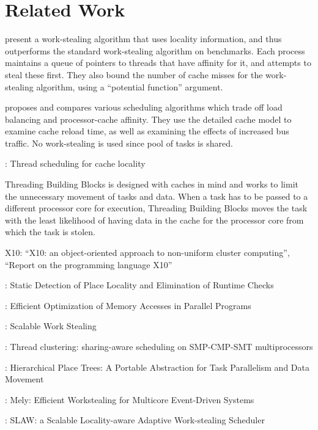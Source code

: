 
\chapter{Related Work}
\label{chap:locality-related-work}

\textcite{Acar2000} present a work-stealing algorithm that uses
locality information, and thus outperforms the standard work-stealing
algorithm on benchmarks. Each process maintains a queue of pointers to
threads that have affinity for it, and attempts to steal these
first. They also bound the number of cache misses for the
work-stealing algorithm, using a ``potential function'' argument.

\textcite{Squillante1993} proposes and compares various scheduling
algorithms which trade off load balancing and processor-cache
affinity. They use the detailed cache model to examine cache reload
time, as well as examining the effects of increased bus traffic. No
work-stealing is used since pool of tasks is shared.

\textcite{Philbin1996}: Thread scheduling for cache locality

Threading Building Blocks \cite{Contreras2008, Reinders2007} is
designed with caches in mind and works to limit the unnecessary
movement of tasks and data. When a task has to be passed to a
different processor core for execution, Threading Building Blocks
moves the task with the least likelihood of having data in the cache
for the processor core from which the task is stolen.

X10: \textcite{Charles2005} ``X10: an object-oriented approach to
non-uniform cluster computing'', \textcite{Saraswat2010} ``Report on
the programming language X10''

\textcite{Agarwal2008}: Static Detection of Place Locality and
Elimination of Runtime Checks

\textcite{Barik2009}: Efficient Optimization of Memory Accesses in
Parallel Programs

\textcite{Dinan2009}: Scalable Work Stealing

\textcite{Tam2007}: Thread clustering: sharing-aware scheduling on
SMP-CMP-SMT multiprocessors

\textcite{Yan2009}: Hierarchical Place Trees: A Portable Abstraction
for Task Parallelism and Data Movement

\textcite{Gaud2010}: Mely: Efficient Workstealing for Multicore
Event-Driven Systems \cite{Gaud2010}

\textcite{Guo2010}: SLAW: a Scalable Locality-aware Adaptive
Work-stealing Scheduler



